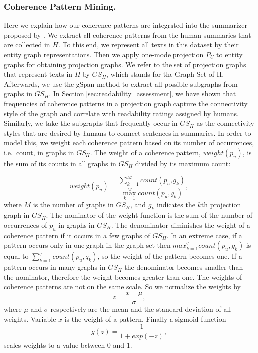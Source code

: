 \subsubsection{Coherence Pattern Mining.}
Here we explain how our coherence patterns are integrated into the summarizer proposed by . 
We extract all coherence patterns from the human summaries that are collected in $H$. 
To this end, we represent all texts in this dataset by their entity graph representations. 
Then we apply one-mode projection $P_U$ to entity graphs for obtaining projection graphs. 
We refer to the set of projection graphs that represent texts in $H$ by $GS_H$, which stands for the Graph Set of H. 
Afterwards, we use the gSpan method to extract all possible subgraphs from  graphs in $GS_H$. 
In Section \ref{sec:readability_assessment}, we have shown that frequencies of coherence patterns in a projection graph capture the connectivity style of the graph and correlate with readability ratings assigned by humans.  
Similarly, we take the subgraphs that frequently occur in $GS_H$ as the connectivity styles that are desired by humans to connect sentences in summaries. 
In order to model this, we weight each coherence pattern based on its number of occurrences, i.e.\ count, in graphs in $GS_H$.  
The weight of a coherence pattern, $weight(p_u)$, is the sum of its counts in all graphs in $GS_H$ divided by its maximum count:

\begin{equation}
\label{eq:ch-weight}
weight(p_u) = \frac{\sum_{k=1}^{M}{count(p_u,g_k)}}{\max_{k=1}^{M}{count(p_u,g_k)}},
\end{equation}
where $M$ is the number of graphs in $GS_H$, and $g_k$ indicates the $k$th projection graph in $GS_H$.
The nominator of the weight function is the sum of the number of occurrences of $p_u$ in graphs in $GS_H$. 
The denominator diminishes the weight of a coherence pattern if it  occurs in a few graphs of $GS_H$. 
In an extreme case, if a pattern occurs only in one graph in the graph set then $max_{k=1}^{q}{count(p_u,g_k)}$ is equal to $\sum_{k=1}^{q}{count(p_u,g_k)}$, so the weight of the pattern becomes one. 
If a pattern occurs in many graphs in $GS_H$ the denominator becomes smaller than the nominator, therefore the weight becomes greater than one. 
The weights of coherence patterns are not on the same scale.  
So we normalize the weights by 
\begin{equation}
z = \frac{x-\mu}{\sigma},
\end{equation}
where $\mu$ and $\sigma$ respectively are the mean and the standard deviation of all weights. Variable $x$ is the weight of a pattern.   
Finally a sigmoid function
\begin{equation}
 g(z) = \frac{1}{1+exp(-z)},
\end{equation}
scales weights to a value between $0$ and $1$. 

